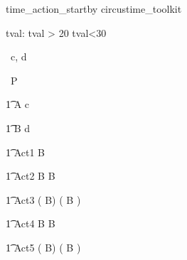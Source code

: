 \begin{zsection}
   \SECTION time\_action\_startby \parents circustime\_toolkit
\end{zsection}


\begin{axdef}
   tval: \nat
\where
   tval > 20 \land tval<30
\end{axdef}


\begin{circus}
   \circchannel\ c, d \\
\end{circus}

\begin{circus}
    \circprocess\ P \circdef \circbegin \\
\end{circus}


\begin{circusaction}
    	\t1 A \circdef c \then \Skip \\
\end{circusaction}

\begin{circusaction}
        \t1 B \circdef d \then \Skip \\
\end{circusaction}

\begin{circusaction}
        \t1 Act1 \circdef  {} \rcirctime \circstartby B  \\
\end{circusaction}

\begin{circusaction}
        \t1 Act2 \circdef  {} \rcirctime \circstartby B  \circseq {} \rcirctime \circstartby B\\
\end{circusaction}

\begin{circusaction}
        \t1 Act3 \circdef (  \rcirctime \circstartby B)  \circseq (  \rcirctime \circstartby B )\\
\end{circusaction}

\begin{circusaction}
        \t1 Act4 \circdef  {} \rcirctime \circstartby B  \extchoice {} \rcirctime \circstartby B\\
\end{circusaction}

\begin{circusaction}
        \t1 Act5 \circdef (  \rcirctime \circstartby B)  \extchoice (  \rcirctime \circstartby B )\\
\end{circusaction}

